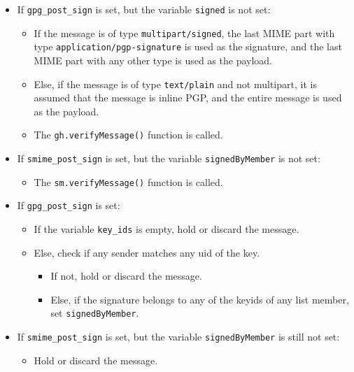 \documentclass[a4]{article}
\newcommand{\var}[1]{\texttt{#1}}
\newcommand{\func}[1]{\texttt{#1()}}
\newcommand{\mime}[1]{\texttt{#1}}
\begin{document}
\begin{itemize}
\item If \var{gpg\_post\_sign} is set, but the variable \var{signed} is not set:
  \begin{itemize}
  \item If the message is of type \mime{multipart/signed},
        the last MIME part with type \mime{application/pgp-signature}
        is used as the signature, and the last MIME part with any other type is used as the payload.
  \item Else, if the message is of type \mime{text/plain} and not multipart,
        it is assumed that the message is inline PGP, and the entire message is used as the payload.
  \item The \func{gh.verifyMessage} function is called.
  \end{itemize}

\item If \var{smime\_post\_sign} is set, but the variable \var{signedByMember} is not set:
  \begin{itemize}
  \item The \func{sm.verifyMessage} function is called.
  \end{itemize}

\item If \var{gpg\_post\_sign} is set:
  \begin{itemize}
  \item If the variable \var{key\_ids} is empty, hold or discard the message.
  \item Else, check if any sender matches any uid of the key.
     \begin{itemize}
     \item If not, hold or discard the message.
     \item Else, if the signature belongs to any of the keyids of any list member, set \var{signedByMember}.
     \end{itemize}
  \end{itemize}

\item If \var{smime\_post\_sign} is set, but the variable \var{signedByMember} is still not set:
  \begin{itemize}
  \item Hold or discard the message.
  \end{itemize}
\end{itemize}
\end{document}
